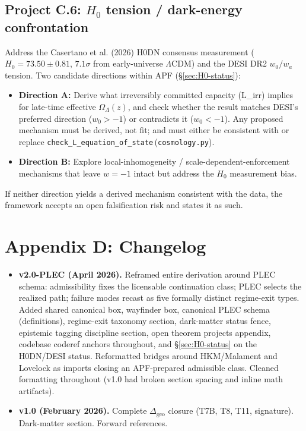 \documentclass[11pt]{article}
\newcommand{\coderef}[2]{\texttt{#1}\,(\texttt{#2})}
\begin{document}
\subsection*{Project C.6: $H_0$ tension / dark-energy confrontation}
Address the Casertano et al. (2026) H0DN consensus measurement
($H_0 = 73.50 \pm 0.81$, $7.1\sigma$ from early-universe $\Lambda$CDM) and the
DESI DR2 $w_0/w_a$ tension. Two candidate directions within APF
(\S\ref{sec:H0-status}):
\begin{itemize}
    \item \textbf{Direction A:} Derive what irreversibly committed capacity
    (L\_irr) implies for late-time effective $\Omega_\Lambda(z)$, and check
    whether the result matches DESI's preferred direction ($w_0 > -1$) or
    contradicts it ($w_0 < -1$). Any proposed mechanism must be derived, not
    fit; and must either be consistent with or replace
    \coderef{check\_L\_equation\_of\_state}{cosmology.py}.
    \item \textbf{Direction B:} Explore local-inhomogeneity /
    scale-dependent-enforcement mechanisms that leave $w = -1$ intact but
    address the $H_0$ measurement bias.
\end{itemize}
If neither direction yields a derived mechanism consistent with the data, the
framework accepts an open falsification risk and states it as such.

\section*{Appendix D: Changelog}

\begin{itemize}[leftmargin=1.5em,nosep]
\item \textbf{v2.0-PLEC (April 2026).} Reframed entire derivation around PLEC
schema: admissibility fixes the licensable continuation class; PLEC selects the
realized path; failure modes recast as five formally distinct regime-exit types.
Added shared canonical box, wayfinder box, canonical PLEC schema (definitions),
regime-exit taxonomy section, dark-matter status fence, epistemic tagging
discipline section, open theorem projects appendix, codebase coderef anchors
throughout, and \S\ref{sec:H0-status} on the H0DN/DESI status. Reformatted
bridges around HKM/Malament and Lovelock as imports closing an APF-prepared
admissible class. Cleaned formatting throughout (v1.0 had broken section
spacing and inline math artifacts).
\item \textbf{v1.0 (February 2026).} Complete $\Delta_{\mathrm{geo}}$ closure (T7B,
T8, T11, signature). Dark-matter section. Forward references.
\end{itemize}
\end{document}
